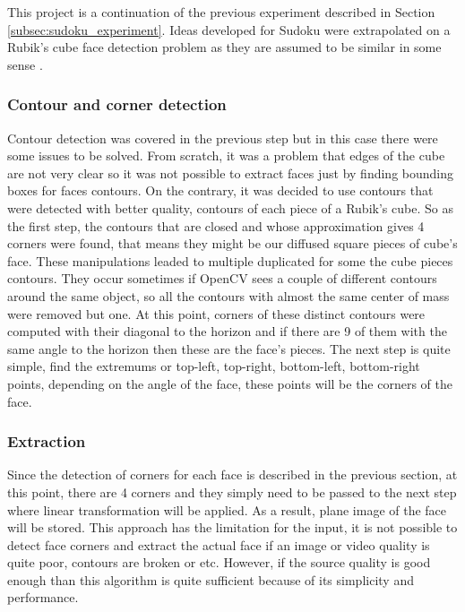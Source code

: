 \documentclass[../../main]{subfiles}
\begin{document}
This project is a continuation of the previous experiment described in Section \ref{subsec:sudoku_experiment}. Ideas developed for Sudoku were extrapolated on a Rubik's cube face detection problem as they are assumed to be similar in some sense \cite{rubiks_cube_zakharov}.

\subsubsection{Contour and corner detection}

Contour detection was covered in the previous step but in this case there were some issues to be solved.
From scratch, it was a problem that edges of the cube are not very clear so it was not possible to extract faces just by finding bounding boxes for faces contours. On the contrary, it was decided to use contours that were detected with better quality, contours of each piece of a Rubik's cube. So as the first step, the contours that are closed and whose approximation gives 4 corners were found, that means they might be our diffused square pieces of cube's face. These manipulations leaded to multiple duplicated for some the cube pieces contours. They occur sometimes if \ac{OpenCV} sees a couple of different contours around the same object, so all the contours with almost the same center of mass were removed but one. At this point, corners of these distinct contours were computed with their diagonal to the horizon and if there are 9 of them with the same angle to the horizon then these are the face's pieces. The next step is quite simple, find the extremums or top-left, top-right, bottom-left, bottom-right points, depending on the angle of the face, these points will be the corners of the face.

\subsubsection{Extraction}

Since the detection of corners for each face is described in the previous section, at this point, there are 4 corners and they simply need to be passed to the next step where linear transformation will be applied. As a result, plane image of the face will be stored.
This approach has the limitation for the input, it is not possible to detect face corners and extract the actual face if an image or video quality is quite poor, contours are broken or etc. However, if the source quality is good enough than this algorithm is quite sufficient because of its simplicity and performance.
\end{document}

